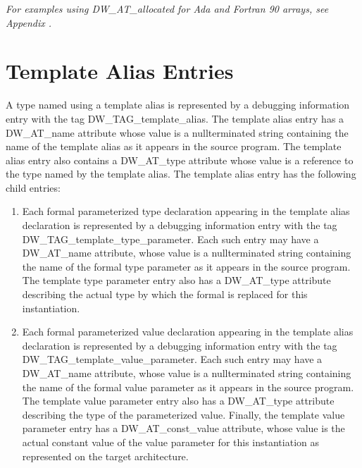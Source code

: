 \textit{For examples using DW\_AT\_allocated for Ada and Fortran 90
arrays, 
see Appendix .}



\section{Template Alias Entries}
\label{chap:templatealiasentries}

A type named using a template alias is represented
by a debugging information entry with the tag
DW\-\_TAG\-\_template\-\_alias. The template alias entry has a
DW\-\_AT\-\_name attribute whose value is a null\dash terminated string
containing the name of the template alias as it appears in
the source program. The template alias entry also contains a
DW\-\_AT\-\_type attribute whose value is a reference to the type
named by the template alias. The template alias entry has
the following child entries:

\begin{enumerate}[1.]
\item Each formal parameterized type declaration appearing
in the template alias declaration is represented
by a debugging information entry with the tag
DW\-\_TAG\-\_template\-\_type\-\_parameter. Each such entry may have
a DW\_AT\_name attribute, whose value is a null\dash terminated
string containing the name of the formal type parameter as it
appears in the source program. The template type parameter
entry also has a DW\-\_AT\-\_type attribute describing the actual
type by which the formal is replaced for this instantiation.

\item Each formal parameterized value declaration
appearing in the template alias declaration is
represented by a debugging information entry with the tag
DW\-\_TAG\-\_template\-\_value\-\_parameter. Each such entry may have
a DW\-\_AT\-\_name attribute, whose value is a null\dash terminated
string containing the name of the formal value parameter
as it appears in the source program. The template value
parameter entry also has a DW\-\_AT\-\_type attribute describing
the type of the parameterized value. Finally, the template
value parameter entry has a DW\-\_AT\-\_const\-\_value attribute, whose
value is the actual constant value of the value parameter for
this instantiation as represented on the target architecture.
\end{enumerate}

